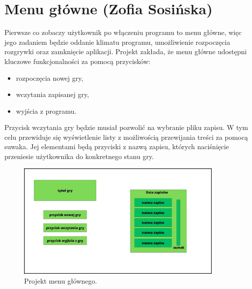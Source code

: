 \section{Menu główne (Zofia Sosińska)}\label{chap:menu_main}
Pierwsze co zobaczy użytkownik po włączeniu programu to menu główne, więc jego zadaniem będzie oddanie klimatu programu,
umożliwienie rozpoczęcia rozgrywki oraz zamknięcie aplikacji.
Projekt zakłada, że menu główne udostępni kluczowe funkcjonalności za pomocą przycisków:
\begin{itemize}
    \item rozpoczęcia nowej gry,
    \item wczytania zapisanej gry,
    \item wyjścia z programu.
\end{itemize}

Przycisk wczytania gry będzie musiał pozwolić na wybranie pliku zapisu. W tym celu przewiduje się wyświetlenie listy
z możliwością przewijania treści za pomocą suwaka. Jej elementami będą przyciski z nazwą zapisu, których naciśnięcie przeniesie 
użytkownika do konkretnego stanu gry.

\begin{figure}[htbp]
    \centering
    \includegraphics[width=0.9\textwidth]{images/ui/ui_prooj_menu.jpg}
    \caption{Projekt menu głównego.
    }\label{fig:compass}
\end{figure}
